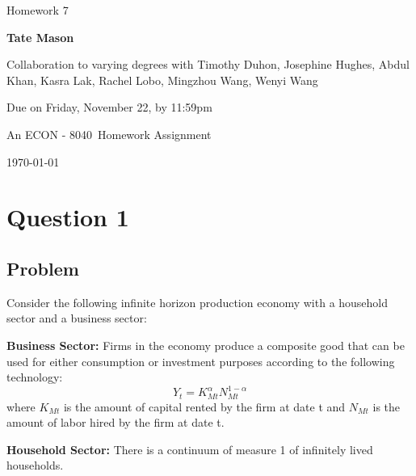 \documentclass[10pt, a4paper]{article}
\newcommand\course{ECON - 8040}
\newcommand\hwnumber{7}
\newcommand\Information{Tate Mason}
\begin{document}
  \begin{titlepage}
    \begin{center}
      \vspace*{3cm}
            
      \vspace{1cm}
      \huge
      Homework \hwnumber
            
      \vspace{1.5cm}
      \Large
            
      \textbf{\Information}
            
      \vfill
      
      Collaboration to varying degrees with Timothy Duhon, Josephine Hughes, Abdul Khan, Kasra Lak, Rachel Lobo, Mingzhou Wang, Wenyi Wang
      \vspace{1cm}
      
      Due on Friday, November 22, by 11:59pm

      \vspace{1cm}

      An \course \ Homework Assignment
            
      \vspace{1cm}
      \Large
      
      \today
            
    \end{center}
  \end{titlepage}
\section*{Question 1}
  \subsection*{Problem}
    Consider the following infinite horizon production economy with a household sector and a business sector:

    \textbf{Business Sector:} Firms in the economy produce a composite good that can be used for either consumption or investment purposes according to the following technology:
    \begin{equation*}
    Y_t = K_{Mt}^\alpha N_{Mt}^{1-\alpha}
    \end{equation*}
    where $K_{Mt}$ is the amount of capital rented by the firm at date t and $N_{Mt}$ is the amount of labor hired by the firm at date t.

    \textbf{Household Sector:} There is a continuum of measure 1 of infinitely lived households.
\end{document}
